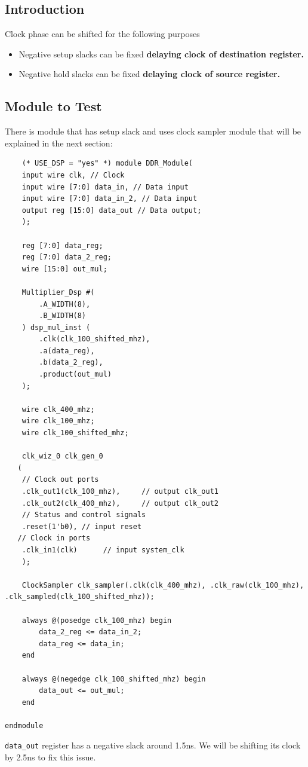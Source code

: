 \documentclass{report}
\begin{document}
\subsection{Introduction}
Clock phase can be shifted for the following purposes
\begin{itemize}
    \item Negative setup slacks can be fixed \textbf{delaying clock of destination register.}
    \item Negative hold slacks can be fixed \textbf{delaying clock of source register.}
\end{itemize}
\subsection{Module to Test}
There is module that has setup slack and uses clock sampler module that will be explained in the next section:
\begin{verbatim}
    (* USE_DSP = "yes" *) module DDR_Module(
    input wire clk, // Clock
    input wire [7:0] data_in, // Data input
    input wire [7:0] data_in_2, // Data input
    output reg [15:0] data_out // Data output;
    );

    reg [7:0] data_reg;
    reg [7:0] data_2_reg;
    wire [15:0] out_mul;
    
    Multiplier_Dsp #(
        .A_WIDTH(8),
        .B_WIDTH(8)
    ) dsp_mul_inst (
        .clk(clk_100_shifted_mhz),
        .a(data_reg),
        .b(data_2_reg),
        .product(out_mul)
    );

    wire clk_400_mhz;
    wire clk_100_mhz;
    wire clk_100_shifted_mhz;

    clk_wiz_0 clk_gen_0
   (
    // Clock out ports
    .clk_out1(clk_100_mhz),     // output clk_out1
    .clk_out2(clk_400_mhz),     // output clk_out2
    // Status and control signals
    .reset(1'b0), // input reset
   // Clock in ports
    .clk_in1(clk)      // input system_clk
    );

    ClockSampler clk_sampler(.clk(clk_400_mhz), .clk_raw(clk_100_mhz), .clk_sampled(clk_100_shifted_mhz));

    always @(posedge clk_100_mhz) begin
        data_2_reg <= data_in_2;
        data_reg <= data_in;
    end

    always @(negedge clk_100_shifted_mhz) begin
        data_out <= out_mul;
    end
    
endmodule
\end{verbatim}
\texttt{data\_out} register has a negative slack around 1.5ns. We will be shifting its clock by 2.5ns to fix this issue.
\end{document}
